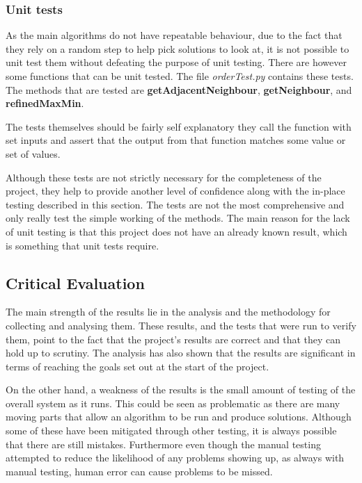 \documentclass[12pt]{report}
\begin{document}
\subsubsection{Unit tests}
As the main algorithms do not have repeatable behaviour, due to the fact that they rely on a random step to help pick solutions to look at, it is not possible to unit test them without defeating the purpose of unit testing. There are however some functions that can be unit tested. The file \textit{orderTest.py} contains these tests. The methods that are tested are \textbf{getAdjacentNeighbour}, \textbf{getNeighbour}, and \textbf{refinedMaxMin}.

The tests themselves should be fairly self explanatory they call the function with set inputs and assert that the output from that function matches some value or set of values.

Although these tests are not strictly necessary for the completeness of the project, they help to provide another level of confidence along with the in-place testing described in this section. The tests are not the most comprehensive and only really test the simple working of the methods. The main reason for the lack of unit testing is that this project does not have an already known result, which is something that unit tests require. 

\subsection{Critical Evaluation}\label{Eval}
The main strength of the results lie in the analysis and the methodology for collecting and analysing them. These results, and the tests that were run to verify them, point to the fact that the project's results are correct and that they can hold up to scrutiny. The analysis has also shown that the results are significant in terms of reaching the goals set out at the start of the project. 

On the other hand, a weakness of the results is the small amount of testing of the overall system as it runs. This could be seen as problematic as there are many moving parts that allow an algorithm to be run and produce solutions. Although some of these have been mitigated through other testing, it is always possible that there are still mistakes. Furthermore even though the manual testing attempted to reduce the likelihood of any problems showing up, as always with manual testing, human error can cause problems to be missed.
\end{document}

